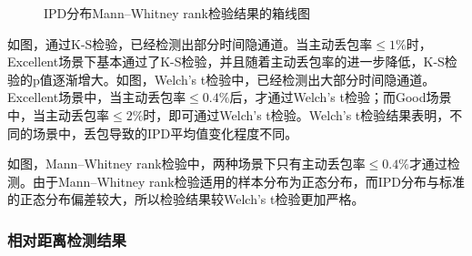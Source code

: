 {	\begin{figure}[htb]
        \centering
        \caption{IPD分布Mann–Whitney rank检验结果的箱线图}
        \label{fig:3:result:ipd:mw}
	\end{figure}
}

如图，通过K-S检验，已经检测出部分时间隐通道。当主动丢包率$\le 1\%$时，Excellent场景下基本通过了K-S检验，并且随着主动丢包率的进一步降低，K-S检验的p值逐渐增大。如图，Welch's t检验中，已经检测出大部分时间隐通道。Excellent场景中，当主动丢包率$\le 0.4\%$后，才通过Welch's t检验；而Good场景中，当主动丢包率$\le 2\%$时，即可通过Welch's t检验。Welch's t检验结果表明，不同的场景中，丢包导致的IPD平均值变化程度不同。

如图，Mann–Whitney rank检验中，两种场景下只有主动丢包率$\le 0.4\%$才通过检测。由于Mann–Whitney rank检验适用的样本分布为正态分布，而IPD分布与标准的正态分布偏差较大，所以检验结果较Welch's t检验更加严格。

\subsubsection{相对距离检测结果}
\label{chap:analyze:result:ipd:distance}

